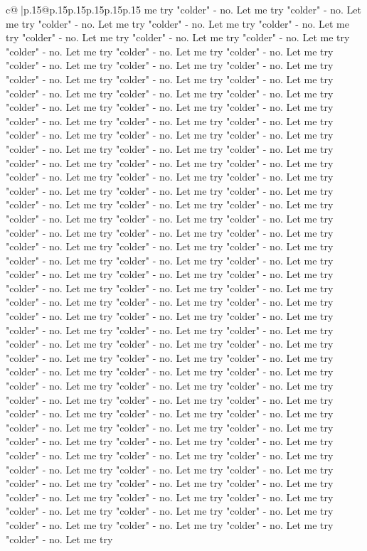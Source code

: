 \documentclass{article}
\begin{document}
{\begin{supertabular}{c@{$\;$}|p{.15\linewidth}@{}p{.15\linewidth}p{.15\linewidth}p{.15\linewidth}p{.15\linewidth}p{.15\linewidth}}
{{{me try "colder" {-} no. Let me try "colder" {-} no. Let me try "colder" {-} no. Let me try "colder" {-} no. Let me try "colder" {-} no. Let me try "colder" {-} no. Let me try "colder" {-} no. Let me try "colder" {-} no. Let me try "colder" {-} no. Let me try "colder" {-} no. Let me try "colder" {-} no. Let me try "colder" {-} no. Let me try "colder" {-} no. Let me try "colder" {-} no. Let me try "colder" {-} no. Let me try "colder" {-} no. Let me try "colder" {-} no. Let me try "colder" {-} no. Let me try "colder" {-} no. Let me try "colder" {-} no. Let me try "colder" {-} no. Let me try "colder" {-} no. Let me try "colder" {-} no. Let me try "colder" {-} no. Let me try "colder" {-} no. Let me try "colder" {-} no. Let me try "colder" {-} no. Let me try "colder" {-} no. Let me try "colder" {-} no. Let me try "colder" {-} no. Let me try "colder" {-} no. Let me try "colder" {-} no. Let me try "colder" {-} no. Let me try "colder" {-} no. Let me try "colder" {-} no. Let me try "colder" {-} no. Let me try "colder" {-} no. Let me try "colder" {-} no. Let me try "colder" {-} no. Let me try "colder" {-} no. Let me try "colder" {-} no. Let me try "colder" {-} no. Let me try "colder" {-} no. Let me try "colder" {-} no. Let me try "colder" {-} no. Let me try "colder" {-} no. Let me try "colder" {-} no. Let me try "colder" {-} no. Let me try "colder" {-} no. Let me try "colder" {-} no. Let me try "colder" {-} no. Let me try "colder" {-} no. Let me try "colder" {-} no. Let me try "colder" {-} no. Let me try "colder" {-} no. Let me try "colder" {-} no. Let me try "colder" {-} no. Let me try "colder" {-} no. Let me try "colder" {-} no. Let me try "colder" {-} no. Let me try "colder" {-} no. Let me try "colder" {-} no. Let me try "colder" {-} no. Let me try "colder" {-} no. Let me try "colder" {-} no. Let me try "colder" {-} no. Let me try "colder" {-} no. Let me try "colder" {-} no. Let me try "colder" {-} no. Let me try "colder" {-} no. Let me try "colder" {-} no. Let me try "colder" {-} no. Let me try "colder" {-} no. Let me try "colder" {-} no. Let me try "colder" {-} no. Let me try "colder" {-} no. Let me try "colder" {-} no. Let me try "colder" {-} no. Let me try "colder" {-} no. Let me try "colder" {-} no. Let me try "colder" {-} no. Let me try "colder" {-} no. Let me try "colder" {-} no. Let me try "colder" {-} no. Let me try "colder" {-} no. Let me try "colder" {-} no. Let me try "colder" {-} no. Let me try "colder" {-} no. Let me try "colder" {-} no. Let me try "colder" {-} no. Let me try "colder" {-} no. Let me try "colder" {-} no. Let me try "colder" {-} no. Let me try "colder" {-} no. Let me try "colder" {-} no. Let me try "colder" {-} no. Let me try "colder" {-} no. Let me try "colder" {-} no. Let me try "colder" {-} no. Let me try "colder" {-} no. Let me try "colder" {-} no. Let me try "colder" {-} no. Let me try "colder" {-} no. Let me try "colder" {-} no. Let me try "colder" {-} no. Let me try "colder" {-} no. Let me try "colder" {-} no. Let me try "colder" {-} no. Let me try "colder" {-} no. Let me try "colder" {-} no. Let me try "colder" {-} no. Let me try "colder" {-} no. Let me try "colder" {-} no. Let me try "colder" {-} no. Let me try }}}
\end{supertabular}}
\end{document}
